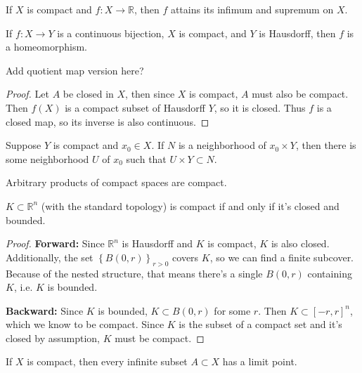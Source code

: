 \documentclass[twoside,10pt]{report}
\begin{document}
\begin{thrm}
If $X$ is compact and $f:X\to \mathbb{R}$, then $f$ attains its infimum and supremum on $X$.
\end{thrm}

\begin{cor}
	If $f:X\to Y$ is a continuous bijection, $X$ is compact, and $Y$ is Hausdorff, then $f$ is a homeomorphism.

	{\color{red}Add quotient map version here?}
\end{cor}
\begin{proof}
	Let $A$ be closed in $X$, then since $X$ is compact, $A$ must also be compact. Then $f(X)$ is a compact subset of Hausdorff $Y$, so it is closed. Thus $f$ is a closed map, so its inverse is also continuous.
\end{proof}

\begin{lem}
	Suppose $Y$ is compact and $x_0 \in X$. If $N$ is a neighborhood of $x_0 \times Y$, then there is some neighborhood $U$ of $x_0$ such that $U \times Y \subset N$.
\end{lem}

\begin{thrm}[Tychonoff]
Arbitrary products of compact spaces are compact.
\end{thrm}

\begin{thrm}
	$K \subset \mathbb{R}^{n}$ (with the standard topology) is compact if and only if it's closed and bounded.
\end{thrm}
\begin{proof}
	\textbf{Forward:} Since $\mathbb{R}^{n}$ is Hausdorff and $K$ is compact, $K$ is also closed. Additionally, the set $\left\{ B(0,r) \right\}_{r>0}$ covers $K$, so we can find a finite subcover. Because of the nested structure, that means there's a single $B(0,r)$ containing $K$, i.e. $K$ is bounded.

	\textbf{Backward:} Since $K$ is bounded, $K \subset B(0,r)$ for some $r$. Then $K \subset [-r,r]^{n}$, which we know to be compact. Since $K$ is the subset of a compact set and it's closed by assumption, $K$ must be compact.
\end{proof}

\begin{prop}
If $X$ is compact, then every infinite subset $A \subset X$ has a limit point.
\end{prop}
\end{document}
